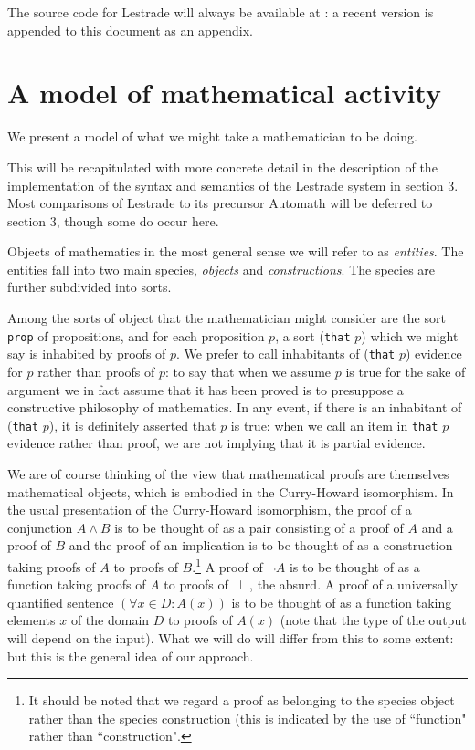 \documentclass[12pt]{article}
\begin{document}
The source code for Lestrade will always be available at \cite{holmessource}:  a recent version is appended to this document as an appendix.

\newpage

\section{A model of mathematical activity}

We present a model of what we might take a mathematician to be doing.

This will be recapitulated with more concrete detail in the description of the implementation of the syntax and semantics of the Lestrade system in section 3.  Most comparisons of Lestrade to its precursor Automath will be deferred to section 3, though some do occur here.

Objects of mathematics in the most general sense we will refer to as {\em entities\/}.  The entities fall into two main species, {\em objects} and {\em constructions}.  The species are further subdivided into sorts.

Among the sorts of object that the mathematician might consider are the sort {\tt prop} of propositions, and for each proposition $p$,
a sort ({\tt that} $p$) which we might say is inhabited by proofs of $p$.  We prefer to call inhabitants of ({\tt that} $p$) evidence for $p$ rather than proofs of $p$:  to say that when we assume $p$ is true for the sake of argument we in fact assume that it has been proved is to presuppose a constructive philosophy of mathematics.  In any event, if there is an inhabitant of ({\tt that} $p$), it is definitely asserted that $p$ is true:  when we call an item in {\tt that} $p$ evidence rather than proof, we are not implying that it is partial evidence.

We are of course thinking of the view that mathematical proofs are themselves mathematical objects, which is embodied in the Curry-Howard isomorphism.  In the usual presentation of the Curry-Howard isomorphism, the proof of a conjunction
$A \wedge B$ is to be thought of as a pair consisting of a proof of $A$ and a proof of $B$ and the  proof of an implication is to be thought of as a construction taking proofs of $A$ to proofs of $B$.\footnote{It should be noted that  we regard a proof as belonging to the species object rather than the species construction (this is indicated by the use of ``function" rather than ``construction".}
A proof of $\neg A$ is to be thought of as a function taking proofs of $A$ to proofs of $\perp$, the absurd.  A proof of a universally quantified sentence $(\forall x \in D:A(x))$ is to be thought of as a function taking elements $x$ of the domain $D$ to proofs of $A(x)$ (note that the type of the output will depend on the input).  What we will do will differ from this to some extent:  but this is the general idea of our approach.
\end{document}
